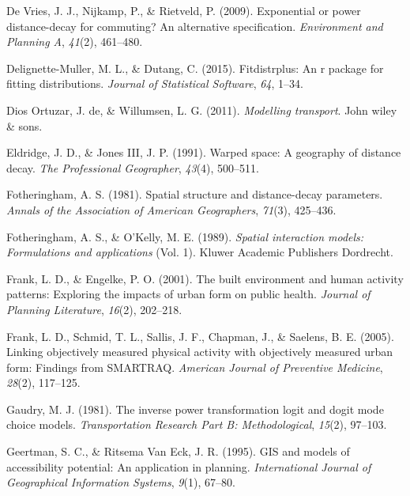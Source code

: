 \documentclass[
11pt, %
oneside, %
english, %
singlespacing, %
]{macthesis} %
\newlength{\cslhangindent}
\newenvironment{CSLReferences}[2] %
 {%
  \setlength{\parindent}{0pt}
  \ifodd #1 \everypar{\setlength{\hangindent}{\cslhangindent}}\ignorespaces\fi
  \ifnum #2 > 0
  \setlength{\parskip}{#2\baselineskip}
  \fi
 }%
 {}
\begin{document}
\begin{CSLReferences}{1}{0}
\leavevmode{}%
De Vries, J. J., Nijkamp, P., \& Rietveld, P. (2009). Exponential or power distance-decay for commuting? An alternative specification. \emph{Environment and Planning A}, \emph{41}(2), 461--480.

\leavevmode{}%
Delignette-Muller, M. L., \& Dutang, C. (2015). Fitdistrplus: An r package for fitting distributions. \emph{Journal of Statistical Software}, \emph{64}, 1--34.

\leavevmode{}%
Dios Ortuzar, J. de, \& Willumsen, L. G. (2011). \emph{Modelling transport}. John wiley \& sons.

\leavevmode{}%
Eldridge, J. D., \& Jones III, J. P. (1991). Warped space: A geography of distance decay. \emph{The Professional Geographer}, \emph{43}(4), 500--511.

\leavevmode{}%
Fotheringham, A. S. (1981). Spatial structure and distance-decay parameters. \emph{Annals of the Association of American Geographers}, \emph{71}(3), 425--436.

\leavevmode{}%
Fotheringham, A. S., \& O'Kelly, M. E. (1989). \emph{Spatial interaction models: Formulations and applications} (Vol. 1). Kluwer Academic Publishers Dordrecht.

\leavevmode{}%
Frank, L. D., \& Engelke, P. O. (2001). The built environment and human activity patterns: Exploring the impacts of urban form on public health. \emph{Journal of Planning Literature}, \emph{16}(2), 202--218.

\leavevmode{}%
Frank, L. D., Schmid, T. L., Sallis, J. F., Chapman, J., \& Saelens, B. E. (2005). Linking objectively measured physical activity with objectively measured urban form: Findings from SMARTRAQ. \emph{American Journal of Preventive Medicine}, \emph{28}(2), 117--125.

\leavevmode{}%
Gaudry, M. J. (1981). The inverse power transformation logit and dogit mode choice models. \emph{Transportation Research Part B: Methodological}, \emph{15}(2), 97--103.

\leavevmode{}%
Geertman, S. C., \& Ritsema Van Eck, J. R. (1995). GIS and models of accessibility potential: An application in planning. \emph{International Journal of Geographical Information Systems}, \emph{9}(1), 67--80.


\end{CSLReferences}
\end{document}
